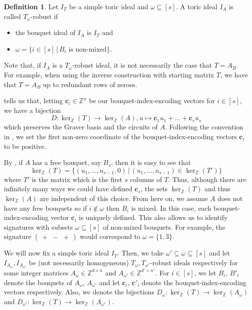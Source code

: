 \documentclass[a4paper, 12pt]{article}
\newcommand{\ZZ}{\mathbb Z}
\theoremstyle{plain}
\theoremstyle{definition}
\newtheorem{definition}[theorem]{Definition}
\theoremstyle{remark}
\begin{document}
\begin{definition}\cite[Definition 2.1]{kosta2023strongly}
    Let $I_T$ be a simple toric ideal and $\omega \subseteq [s]$. A toric ideal $I_A$ is called $T_{\omega}$-robust if 
    \begin{itemize}
        \item the bouquet ideal of $I_A$ is $I_T$ and
        \item $\omega=\{i \in [s] \,|\, B_i\text{ is non-mixed}\}$.
    \end{itemize}
\end{definition}

Note that, if $I_A$ is a $T_{\omega}$-robust ideal, it is not necessarily the case that $T=A_B$. For example, when using the inverse construction with starting matrix $T$, we have that $T=A_B$ up to redundant rows of zeroes. %

\cite[Theorem~1.9]{petrovic2018bouquet} tells us that, letting $\mathbf{c}_i \in \ZZ^n$ be our bouquet-index-encoding vectors for $i \in[s]$, we have a bijection 
$$D:\ker_\ZZ(T) \rightarrow \ker_\ZZ(A),u \mapsto \mathbf{c}_1 u_1 +\dots+ \mathbf{c}_s u_s$$
which preserves the Graver basis and the circuits of $A$. Following the convention in \cite{petrovic2018bouquet}, we set the first non-zero coordinate of the bouquet-index-encoding vectors $\mathbf{c}_i$ to be positive.

By \cite[Remark 1.8]{petrovic2018bouquet}, if $A$ has a free bouquet, say $B_s$, then it is easy to see that
$$\ker_\ZZ(T)=\{(u_1,\dots,u_{s-1},0) \,|\, (u_1,\dots,u_{s-1})  \in \ker_\ZZ(T')\}$$
where $T'$ is the matrix which is the first $s$ columns of $T$. Thus, although there are infinitely many ways we could have defined $\mathbf{c}_s$, the sets $\ker_\ZZ(T)$ and thus $\ker_\ZZ(A)$ are independent of this choice. From here on, we assume $A$ does not have any free bouquets so if $i \not \in \omega$ then $B_i$ is mixed. In this case, each bouquet-index-encoding vector $\mathbf{c}_i$ is uniquely defined. This also allows us to identify signatures with subsets $\omega \subseteq [s]$ of non-mixed bouquets. For example, the signature $\begin{pmatrix}+&-&+\end{pmatrix}$ would correspond to $\omega=\{1,3\}$.

We will now fix a simple toric ideal $I_T$. Then, we take $\omega' \subseteq \omega \subseteq [s]$ and let $I_{A_{\omega}},I_{A_{\omega'}}$ be (not necessarily homogeneous) $T_{\omega},T_{\omega'}$-robust ideals respectively for some integer matrices $A_{\omega} \in \ZZ^{d \times n}$ and $A_{\omega'}\in \ZZ^{d' \times n'}$. For $i \in [s]$, we let $B_i$, $B'_i$ denote the bouquets of $A_{\omega}$, $A_{\omega'}$ and let $\mathbf{c}_i$, $\mathbf{c}'_i$ denote the bouquet-index-encoding vectors respectively. Also, we denote the bijections $D_{\omega}: \ker_\ZZ(T) \rightarrow \ker_\ZZ(A_{\omega})$ and $D_{\omega'}: \ker_\ZZ(T) \rightarrow \ker_\ZZ(A_{\omega'})$.
\end{document}
